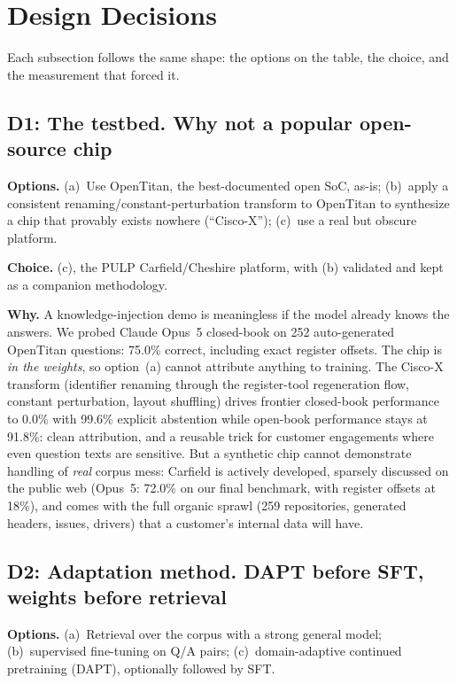 \section{Design Decisions}
\label{sec:decisions}

Each subsection follows the same shape: the options on the table, the choice,
and the measurement that forced it.

\subsection{D1: The testbed. Why not a popular open-source chip}
\label{sec:d1}

\textbf{Options.} (a)~Use OpenTitan, the best-documented open SoC, as-is;
(b)~apply a consistent renaming/constant-perturbation transform to OpenTitan
to synthesize a chip that provably exists nowhere (``Cisco-X''); (c)~use a
real but obscure platform.

\textbf{Choice.} (c), the PULP Carfield/Cheshire platform, with (b) validated
and kept as a companion methodology.

\textbf{Why.} A knowledge-injection demo is meaningless if the model already
knows the answers. We probed Claude Opus~5 closed-book on 252 auto-generated
OpenTitan questions: 75.0\% correct, including exact register offsets. The
chip is \emph{in the weights}, so option~(a) cannot attribute anything to
training. The Cisco-X transform (identifier renaming through the register-tool
regeneration flow, constant perturbation, layout shuffling) drives frontier
closed-book performance to 0.0\% with 99.6\% explicit abstention while
open-book performance stays at 91.8\%: clean attribution, and a reusable
trick for customer engagements where even question texts are sensitive. But a
synthetic chip cannot demonstrate handling of \emph{real} corpus mess:
Carfield is actively developed, sparsely discussed on the public web
(Opus~5: 72.0\% on our final benchmark, with register offsets at 18\%), and
comes with the full organic sprawl (259 repositories, generated headers,
issues, drivers) that a customer's internal data will have.

\subsection{D2: Adaptation method. DAPT before SFT, weights before retrieval}
\label{sec:d2}

\textbf{Options.} (a)~Retrieval over the corpus with a strong general model;
(b)~supervised fine-tuning on Q/A pairs; (c)~domain-adaptive continued
pretraining (DAPT), optionally followed by SFT.

